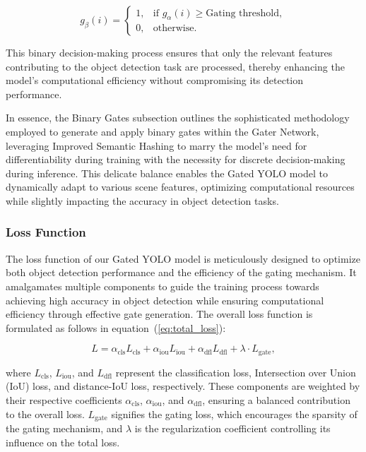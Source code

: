 \begin{equation}
g_{\beta}(i) = 
\begin{cases}
1, & \text{if } g_{\alpha}(i) \geq \text{Gating threshold},\\
0, & \text{otherwise}.
\end{cases}
\label{eq:hard_binary_decision}
\end{equation}

This binary decision-making process ensures that only the relevant features contributing to the object detection task are processed, thereby enhancing the model's computational efficiency without compromising its detection performance.

In essence, the Binary Gates subsection outlines the sophisticated methodology employed to generate and apply binary gates within the Gater Network, leveraging Improved Semantic Hashing to marry the model's need for differentiability during training with the necessity for discrete decision-making during inference. This delicate balance enables the Gated YOLO model to dynamically adapt to various scene features, optimizing computational resources while slightly impacting the accuracy in object detection tasks.

\subsubsection{Loss Function}
The loss function of our Gated YOLO model is meticulously designed to optimize both object detection performance and the efficiency of the gating mechanism. It amalgamates multiple components to guide the training process towards achieving high accuracy in object detection while ensuring computational efficiency through effective gate generation. The overall loss function is formulated as follows in equation~(\ref{eq:total_loss}):

\begin{equation}
L = \alpha_{\text{cls}} L_{\text{cls}} + \alpha_{\text{iou}} L_{\text{iou}} + \alpha_{\text{dfl}} L_{\text{dfl}} + \lambda \cdot L_{\text{gate}},
\label{eq:total_loss}
\end{equation}

\noindent{}where \(L_{\text{cls}}\), \(L_{\text{iou}}\), and \(L_{\text{dfl}}\) represent the classification loss, Intersection over Union (IoU) loss, and distance-IoU loss, respectively. These components are weighted by their respective coefficients \(\alpha_{\text{cls}}\), \(\alpha_{\text{iou}}\), and \(\alpha_{\text{dfl}}\), ensuring a balanced contribution to the overall loss. \(L_{\text{gate}}\) signifies the gating loss, which encourages the sparsity of the gating mechanism, and \(\lambda\) is the regularization coefficient controlling its influence on the total loss.

